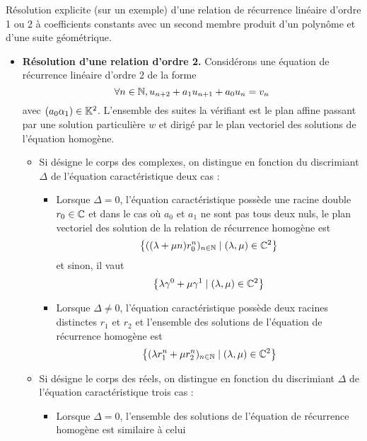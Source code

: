 \documentclass{article}
\renewenvironment{question_kholle}[2][ ]
{
	\subsection{\texorpdfstring{#2}{}}
	\notblank{#1}
	{
		\noindent #1
		\bigbreak
	}
	{}
	\begin{proof}
}
{
	\end{proof}
}
\begin{document}
\begin{question_kholle}{Résolution explicite (sur un exemple) d’une
		relation de récurrence linéaire d’ordre 1 ou 2 à coefficients
		constants avec un second membre produit d’un polynôme et d’une
		suite géométrique.}
\begin{itemize}
		\item \textbf{Résolution d’une relation d’ordre 2.}
		      Considérons une équation de récurrence linéaire d’ordre 2 de la forme
		      \[
			      \forall n\in\mathbb N, u_{n+2}+a_{1}u_{n+1}+a_{0}u_{n} = v_{n}
		      \]
		      avec $(a_{0}\alpha_{1})\in\mathbb K^{2}$. L’ensemble des suites la
		      vérifiant est le plan affine passant par une solution
		      particulière $w$ et dirigé par le plan vectoriel des solutions
		      de l’équation homogène.
		      \begin{itemize}
			      \item Si \K désigne le corps des complexes, on distingue en
			            fonction du discrimiant $\Delta$ de l’équation
			            caractéristique deux cas :
			            \begin{itemize}
				            \item Lorsque $\Delta=0$, l’équation caractéristique
				                  possède une racine double $r_{0}\in\mathbb C$ et dans le cas
				                  où $a_{0}$ et $a_{1}$ ne sont pas tous deux nuls, le
				                  plan vectoriel des solution de la relation de
				                  récurrence homogène est
				                  \[
					                  \left\{((\lambda+\mu n)r_{0}^{n})_{n\in\mathbb N} \mid
					                  (\lambda,\mu)\in\mathbb C^{2}\right\}
				                  \]
				                  et sinon, il vaut
				                  \[
					                  \left\{\lambda \gamma^{0} + \mu \gamma^{1} \mid
					                  (\lambda, \mu)\in\mathbb C^{2}\right\}
				                  \]
				            \item Lorsque $\Delta\neq 0$, l’équation caractéristique
				                  possède deux racines distinctes $r_{1}$ et $r_{2}$ et
				                  l’ensemble des solutions de l’équation de récurrence homogène est
				                  \[
					                  \left\{(\lambda r_{1}^{n}+ \mu r_{2}^{n})_{n\in\mathbb N}
					                  \mid (\lambda, \mu)\in\mathbb C^{2}\right\}
				                  \]
			            \end{itemize}
			      \item Si \K désigne le corps des réels, on distingue en
			            fonction du discrimiant $\Delta$ de l’équation
			            caractéristique trois cas :
			            \begin{itemize}
				            \item Lorsque $\Delta=0$, l’ensemble des solutions de
				                  l’équation de récurrence homogène est similaire à celui

\end{itemize}
\end{itemize}
\end{itemize}
\end{question_kholle}
\end{document}
